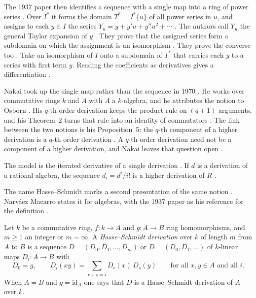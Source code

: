 The 1937 paper then identifies a sequence with a single map into a ring of
power series \cite[p.~225]{HasseSchmidt1937}. Over $I^{*}$ it forms the domain
$T^{*}=I^{*}\{u\}$ of all power series in $u$, and assigns to each $y\in I$
the series $Y_{u}=y+y'u+y''u^{2}+\cdots$ \cite[p.~225]{HasseSchmidt1937}. The
authors call $Y_{u}$ the general Taylor expansion of $y$
\cite[p.~225]{HasseSchmidt1937}. They prove that the assigned series form a
subdomain on which the assignment is an isomorphism
\cite[Satz~1, p.~226]{HasseSchmidt1937}. They prove the converse too
\cite[Satz~2, p.~226]{HasseSchmidt1937}. Take an isomorphism of $I$ onto a
subdomain of $T^{*}$ that carries each $y$ to a series with first term $y$.
Reading the coefficients as derivatives gives a differentiation
\cite[Satz~2, p.~226]{HasseSchmidt1937}.

Nakai took up the single map rather than the sequence in 1970
\cite[p.~1]{Nakai1970}. He works over commutative rings $k$ and $A$ with $A$ a
$k$-algebra, and he attributes the notion to Osborn
\cite[p.~1]{Nakai1970}. His $q$-th order derivation keeps the product rule on
$(q+1)$ arguments, and his Theorem~2 turns that rule into an identity of
commutators \cite[Theorem~2, p.~3]{Nakai1970}. The link between the two
notions is his Proposition~5: the $q$-th component of a higher derivation is a
$q$-th order derivation \cite[Proposition~5, p.~4]{Nakai1970}. A $q$-th order
derivation need not be a component of a higher derivation, and Nakai leaves
that question open \cite[p.~1]{Nakai1970}.

The model is the iterated derivative of a single derivation
\cite[p.~2322]{FerreroHaetinger2002}. If $d$ is a derivation of a rational
algebra, the sequence $d_i=d^{i}/i!$ is a higher derivation of $R$
\cite[p.~2322]{FerreroHaetinger2002}.

The name Hasse--Schmidt marks a second presentation of the same notion
\cite[p.~2983]{NarvaezMacarro2009}. Narváez Macarro states it for algebras,
with the 1937 paper as his reference for the definition
\cite[§1.1, reference~7]{NarvaezMacarro2009}.

\begin{definition}\label{def:higher:hs}
Let $k$ be a commutative ring, $f\colon k\to A$ and $g\colon A\to B$ ring
homomorphisms, and $m\geq 1$ an integer or $m=\infty$. A
\emph{Hasse--Schmidt derivation} over $k$ of length $m$ from $A$ to $B$ is a
sequence $D=(D_0,D_1,\dots,D_m)$ or $D=(D_0,D_1,\dots)$ of $k$-linear
maps $D_i\colon A\to B$ with
\begin{equation*}
D_0=g,\qquad D_i(xy)=\sum_{r+s=i}D_r(x)\,D_s(y)
\qquad\text{for all }x,y\in A\text{ and all }i.
\end{equation*}
When $A=B$ and $g=\mathrm{id}_A$ one says that $D$ is a Hasse--Schmidt
derivation of $A$ over $k$.
\end{definition}

